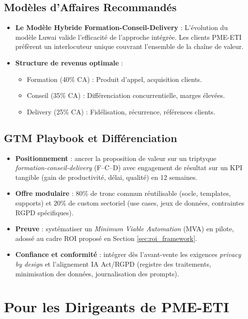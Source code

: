 \subsection{Modèles d'Affaires Recommandés}

\begin{itemize}
    \item \textbf{Le Modèle Hybride Formation-Conseil-Delivery} : L'évolution du modèle Luwai valide l'efficacité de l'approche intégrée. Les clients PME-ETI préfèrent un interlocuteur unique couvrant l'ensemble de la chaîne de valeur.
    \item \textbf{Structure de revenus optimale} :
    \begin{itemize}
        \item Formation (40\% CA) : Produit d'appel, acquisition clients.
        \item Conseil (35\% CA) : Différenciation concurrentielle, marges élevées.
        \item Delivery (25\% CA) : Fidélisation, récurrence, références clients.
    \end{itemize}
\end{itemize}

\subsection{GTM Playbook et Différenciation}
\begin{itemize}
    \item \textbf{Positionnement} : ancrer la proposition de valeur sur un triptyque \emph{formation-conseil-delivery} (F–C–D) avec engagement de résultat sur un KPI tangible (gain de productivité, délai, qualité) en 12 semaines.
    \item \textbf{Offre modulaire} : 80\% de tronc commun réutilisable (socle, templates, supports) et 20\% de custom sectoriel (use cases, jeux de données, contraintes RGPD spécifiques).
    \item \textbf{Preuve} : systématiser un \emph{Minimum Viable Automation} (MVA) en pilote, adossé au cadre ROI proposé en Section \ref{sec:roi_framework}.
    \item \textbf{Confiance et conformité} : intégrer dès l’avant-vente les exigences \emph{privacy by design} et l’alignement IA Act/RGPD (registre des traitements, minimisation des données, journalisation des prompts).
\end{itemize}

\section{Pour les Dirigeants de PME-ETI}

